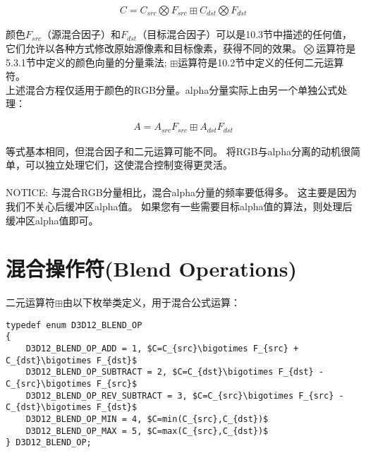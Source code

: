 \begin{align*}
C=C_{src}\bigotimes F_{src}\boxplus C_{dst}\bigotimes F_{dst}
\end{align*}

\begin{flushleft}
颜色$F_{src}$（源混合因子）和$F_{dst}$（目标混合因子）可以是10.3节中描述的任何值，它们允许以各种方式修改原始源像素和目标像素，获得不同的效果。$\bigotimes$运算符是5.3.1节中定义的颜色向量的分量乘法; $\boxplus$运算符是10.2节中定义的任何二元运算符。\\

上述混合方程仅适用于颜色的RGB分量。alpha分量实际上由另一个单独公式处理：\\
\end{flushleft}

\begin{align*}
A=A_{src}F_{src}\boxplus A_{dst}F_{dst}
\end{align*}

\begin{flushleft}
等式基本相同，但混合因子和二元运算可能不同。 将RGB与alpha分离的动机很简单，可以独立处理它们，这使混合控制变得更灵活。\\
~\\
NOTICE: 与混合RGB分量相比，混合alpha分量的频率要低得多。 这主要是因为我们不关心后缓冲区alpha值。 如果您有一些需要目标alpha值的算法，则处理后缓冲区alpha值即可。
~\\
\end{flushleft}

\section{混合操作符(Blend Operations)}
\begin{flushleft}
二元运算符$\boxplus$由以下枚举类定义，用于混合公式运算：\\
\end{flushleft}

\begin{lstlisting}[mathescape]
typedef enum D3D12_BLEND_OP
{
    D3D12_BLEND_OP_ADD = 1, $C=C_{src}\bigotimes F_{src} + C_{dst}\bigotimes F_{dst}$
    D3D12_BLEND_OP_SUBTRACT = 2, $C=C_{dst}\bigotimes F_{dst} - C_{src}\bigotimes F_{src}$
    D3D12_BLEND_OP_REV_SUBTRACT = 3, $C=C_{src}\bigotimes F_{src} - C_{dst}\bigotimes F_{dst}$
    D3D12_BLEND_OP_MIN = 4, $C=min(C_{src},C_{dst})$
    D3D12_BLEND_OP_MAX = 5, $C=max(C_{src},C_{dst})$
} D3D12_BLEND_OP;
\end{lstlisting}

